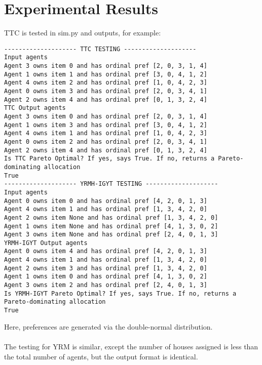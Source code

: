 \documentclass[12pt]{article}
\begin{document}
\section*{Experimental Results}
TTC is tested in sim.py and outputs, for example:
\begin{verbatim}
-------------------- TTC TESTING --------------------
Input agents
Agent 3 owns item 0 and has ordinal pref [2, 0, 3, 1, 4]
Agent 1 owns item 1 and has ordinal pref [3, 0, 4, 1, 2]
Agent 4 owns item 2 and has ordinal pref [1, 0, 4, 2, 3]
Agent 0 owns item 3 and has ordinal pref [2, 0, 3, 4, 1]
Agent 2 owns item 4 and has ordinal pref [0, 1, 3, 2, 4]
TTC Output agents
Agent 3 owns item 0 and has ordinal pref [2, 0, 3, 1, 4]
Agent 1 owns item 3 and has ordinal pref [3, 0, 4, 1, 2]
Agent 4 owns item 1 and has ordinal pref [1, 0, 4, 2, 3]
Agent 0 owns item 2 and has ordinal pref [2, 0, 3, 4, 1]
Agent 2 owns item 4 and has ordinal pref [0, 1, 3, 2, 4]
Is TTC Pareto Optimal? If yes, says True. If no, returns a Pareto-dominating allocation
True
-------------------- YRMH-IGYT TESTING --------------------
Input agents
Agent 0 owns item 0 and has ordinal pref [4, 2, 0, 1, 3]
Agent 4 owns item 1 and has ordinal pref [1, 3, 4, 2, 0]
Agent 2 owns item None and has ordinal pref [1, 3, 4, 2, 0]
Agent 1 owns item None and has ordinal pref [4, 1, 3, 0, 2]
Agent 3 owns item None and has ordinal pref [2, 4, 0, 1, 3]
YRMH-IGYT Output agents
Agent 0 owns item 4 and has ordinal pref [4, 2, 0, 1, 3]
Agent 4 owns item 1 and has ordinal pref [1, 3, 4, 2, 0]
Agent 2 owns item 3 and has ordinal pref [1, 3, 4, 2, 0]
Agent 1 owns item 0 and has ordinal pref [4, 1, 3, 0, 2]
Agent 3 owns item 2 and has ordinal pref [2, 4, 0, 1, 3]
Is YRMH-IGYT Pareto Optimal? If yes, says True. If no, returns a Pareto-dominating allocation
True
\end{verbatim}
Here, preferences are generated via the double-normal distribution.\\\\The testing for YRM is similar, except the number of houses assigned is less than the total number of agents, but the output format is identical.
 
\end{document}
